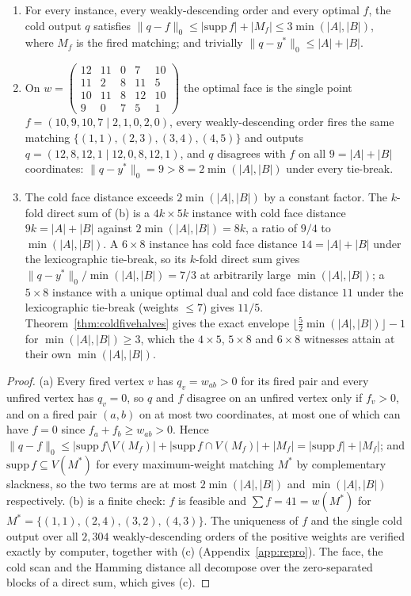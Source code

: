 \begin{proposition}\label{prop:coldrefuted}
\begin{enumerate}
\item[(a)] For every instance, every weakly-descending order and every optimal $f$, the cold output $q$
satisfies $\|q - f\|_0 \le |\mathrm{supp}\, f| + |M_f| \le 3\min(|A|,|B|)$, where $M_f$ is the
fired matching; and trivially $\|q - y^*\|_0 \le |A| + |B|$.
\item[(b)] On
$w = \left(\begin{smallmatrix} 12&11&0&7&10\\ 11&2&8&11&5\\ 10&11&8&12&10\\ 9&0&7&5&1 \end{smallmatrix}\right)$
the optimal face is the single point $f = (10,9,10,7 \mid 2,1,0,2,0)$, every weakly-descending
order fires the same matching $\{(1,1),(2,3),(3,4),(4,5)\}$ and outputs
$q = (12,8,12,1 \mid 12,0,8,12,1)$, and $q$ disagrees with $f$ on all $9 = |A| + |B|$ coordinates:
$\|q - y^*\|_0 = 9 > 8 = 2\min(|A|,|B|)$ under every tie-break.
\item[(c)] The cold face distance exceeds $2\min(|A|,|B|)$ by a constant factor.
The $k$-fold direct sum of (b) is a $4k \times 5k$ instance with cold face distance
$9k = |A| + |B|$ against $2\min(|A|,|B|) = 8k$, a ratio of $9/4$ to $\min(|A|,|B|)$. A
$6 \times 8$ instance has cold face distance $14 = |A| + |B|$ under the lexicographic tie-break, so
its $k$-fold direct sum gives $\|q - y^*\|_0 / \min(|A|,|B|) = 7/3$ at arbitrarily large
$\min(|A|,|B|)$; a $5 \times 8$ instance with a unique optimal dual and cold face distance $11$
under the lexicographic tie-break (weights $\le 7$) gives $11/5$.
Theorem~\ref{thm:coldfivehalves} gives the exact envelope
$\lfloor \tfrac{5}{2}\min(|A|,|B|) \rfloor - 1$ for $\min(|A|,|B|) \ge 3$, which the
$4 \times 5$, $5 \times 8$ and $6 \times 8$ witnesses attain at their own $\min(|A|,|B|)$.
\end{enumerate}
\end{proposition}
\begin{proof}
(a) Every fired vertex $v$ has $q_v = w_{ab} > 0$ for its fired pair and every unfired vertex has
$q_v = 0$, so $q$ and $f$ disagree on an unfired vertex only if $f_v > 0$, and on a fired pair
$(a, b)$ on at most two coordinates, at most one of which can have $f = 0$ since
$f_a + f_b \ge w_{ab} > 0$. Hence $\|q - f\|_0 \le |\mathrm{supp}\, f \setminus V(M_f)| +
|\mathrm{supp}\, f \cap V(M_f)| + |M_f| = |\mathrm{supp}\, f| + |M_f|$; and $\mathrm{supp}\, f
\subseteq V(M^*)$ for every maximum-weight matching $M^*$ by complementary slackness, so the two
terms are at most $2\min(|A|,|B|)$ and $\min(|A|,|B|)$ respectively. (b) is a finite check:
$f$ is feasible and $\sum f = 41 = w(M^*)$ for $M^* = \{(1,1),(2,4),(3,2),(4,3)\}$. The
uniqueness of $f$ and the single cold output over all $2{,}304$ weakly-descending orders of the
positive weights are verified exactly by computer, together with (c) (Appendix~\ref{app:repro}). The face,
the cold scan and the Hamming distance all decompose over the zero-separated blocks of a direct
sum, which gives (c).
\end{proof}

